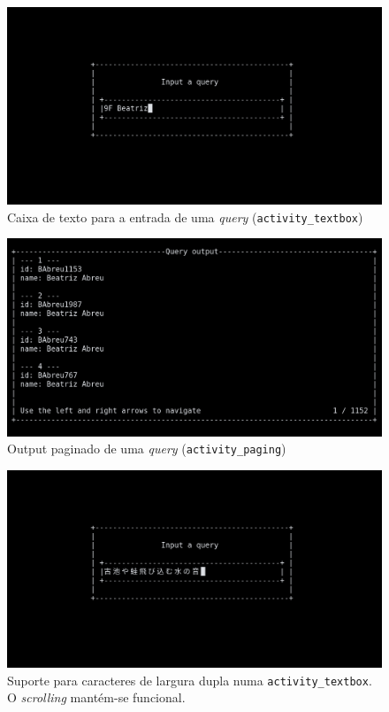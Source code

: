 \documentclass[12pt, a4paper]{article}
\begin{document}
\begin{figure}[ht]
    \centering
    \includegraphics[scale=0.25]{res-fase2/interactive_screenshots/textbox.png}
    \caption{Caixa de texto para a entrada de uma \emph{query} (\texttt{activity\_textbox})}
    \label{fig:textbox}
\end{figure}

\begin{figure}[ht]
    \centering
    \includegraphics[scale=0.25]{res-fase2/interactive_screenshots/paging.png}
    \caption{Output paginado de uma \emph{query} (\texttt{activity\_paging})}
    \label{fig:paging}
\end{figure}

\begin{figure}[ht]
    \centering
    \includegraphics[scale=0.25]{res-fase2/interactive_screenshots/japanese.png}
    \caption{Suporte para caracteres de largura dupla numa \texttt{activity\_textbox}.
             O \emph{scrolling} mantém-se funcional.}
    \label{fig:japanese}
\end{figure}
\end{document}
